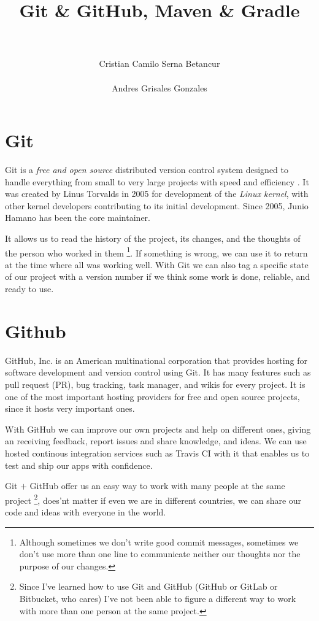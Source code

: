 \documentclass[a4paper,11pt]{article}
\title{Git \& GitHub, Maven \& Gradle}
\author{\\\\ Cristian Camilo Serna Betancur \\\\ Andres Grisales Gonzales}
\begin{document}
\maketitle
\tableofcontents

\section{Git}
Git is a \emph{free and open source} distributed version control system designed 
to handle everything from small to very large projects with speed and efficiency
\cite{git}. It was created by Linus Torvalds in 2005 for development of the 
\emph{Linux kernel}, with other kernel developers contributing to its initial 
development. Since 2005, Junio Hamano has been the core maintainer\cite{gita}.

It allows us to read the history of the project, its changes, and the thoughts 
of the person who worked in them \footnote{Although sometimes we don't write 
good commit messages, sometimes we don't use more than one line to communicate 
neither our thoughts nor the purpose of our changes.}. If something is wrong, 
we can use it to return at the time where all was working well. With Git we can 
also tag a specific state of our project with a version number if we think some 
work is done, reliable, and ready to use.

\section{Github}
GitHub, Inc. is an American multinational corporation that provides hosting for 
software development and version control using Git\cite{github}. It has many 
features such as pull request (PR), bug tracking, task manager, and wikis for 
every project. It is one of the most important hosting providers for free and 
open source projects, since it hosts very important ones.

With GitHub we can improve our own projects and help on different ones, giving 
an receiving feedback, report issues and share knowledge, and ideas. We can use
hosted continous integration services such as Travis CI with it that enables us
to test and ship our apps with confidence\cite{travis}.

Git $+$ GitHub offer us an easy way to work with many people at the same project
\footnote{Since I've learned how to use Git and GitHub (GitHub or GitLab or 
Bitbucket, who cares) I've not been able to figure a different way to work with 
more than one person at the same project.}, does'nt matter if even we are in 
different countries, we can share our code and ideas with everyone in the world.
\end{document}
